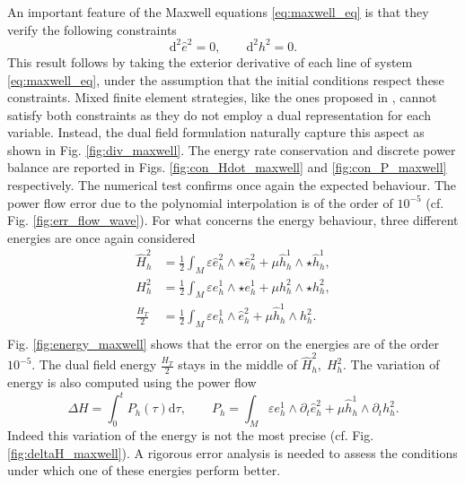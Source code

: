 \documentclass{elsarticle}
\renewcommand\d{\ensuremath{\mathrm{d}}}
\newcommand*{\dual}[1]{\ensuremath{\widehat{#1}}}
\begin{document}
An important feature of the Maxwell equations \eqref{eq:maxwell_eq} is that they verify the following constraints
\begin{equation*}
    \d^2 \dual{e}^2 = 0, \qquad \d^2 h^2=0.
\end{equation*}
This result follows by taking the exterior derivative of each line of system \eqref{eq:maxwell_eq}, under the assumption that the initial conditions respect these constraints. Mixed finite element strategies, like the ones proposed in \cite{asad2019maxwell,farle2013,payen2020}, cannot satisfy both constraints as they do not employ a dual representation for each variable. Instead, the dual field formulation naturally capture this aspect as shown in Fig. \ref{fig:div_maxwell}. The energy rate conservation and discrete power balance are reported in Figs. \ref{fig:con_Hdot_maxwell} and \ref{fig:con_P_maxwell} respectively. The numerical test confirms once again the expected behaviour. The power flow error due to the polynomial interpolation is of the order of $10^{-5}$ (cf. Fig. \ref{fig:err_flow_wave}). 
For what concerns the energy behaviour, three different energies are once again considered
\begin{equation*}
\begin{aligned}
    \dual{H}^{2}_h&= \frac{1}{2} \int_M \varepsilon \dual{e}^2_h \wedge \star \dual{e}^2_h + \mu \dual{h}^1_h \wedge \star \dual{h}_h^1, \\
    H^{2}_h&= \frac{1}{2} \int_M \varepsilon e^1_h \wedge \star e^1_h + \mu h^2_h \wedge \star h_h^2, \\
    \frac{H_T}{2} &= \frac{1}{2} \int_M \varepsilon e^1_h \wedge \dual{e}^2_h + \mu \dual{h}^1_h \wedge h_h^2. \\
\end{aligned}
\end{equation*}
Fig. \ref{fig:energy_maxwell} shows that the error on the energies are of the order $10^{-5}$. The dual field energy $\frac{H_T}{2}$ stays in the middle of $\dual{H}^{2}_h, \; H^{2}_h$. The variation of energy is also computed using the power flow 
\begin{equation*}
    \Delta H = \int_0^t P_h(\tau) \d\tau, \qquad P_h = \int_M \varepsilon e^1_h \wedge \partial_t \widehat{e}^2_h + \mu \widehat{h}^1_h \wedge \partial_t h_h^2.
\end{equation*}
Indeed this variation of the energy is not the most precise (cf. Fig. \ref{fig:deltaH_maxwell}). A rigorous error analysis is needed to assess the conditions under which one of these energies perform better. 
\end{document}
